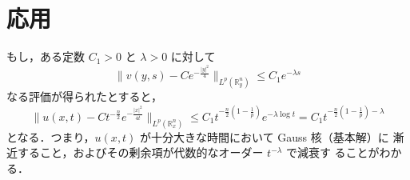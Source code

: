 \documentclass[paper=a4,
fontsize=12pt,
reqno,
uplatex,
dvipdfmx]{jlreq}
\theoremstyle{definition} %
\begin{document}
\section{応用}
もし，ある定数 $C_1 > 0$ と $\lambda > 0$ に対して
\begin{equation}
 \|
  v(y, s) - C e^{-\frac{|y|^2}{4}}
  \|_{L^p(\mathbb{R}_y^n)}
  \le
  C_1 e^{-\lambda s} 
\end{equation}
なる評価が得られたとすると，
\begin{equation}
 \|
  u(x, t) - C t^{-\frac{n}{2}} e^{-\frac{|x|^2}{4t}}
  \|_{L^p(\mathbb{R}_x^n)}
  \le
  C_1 t^{-\frac{n}{2}
  \left(
   1 - \frac{1}{p}
  \right)}
  e^{-\lambda \log t}
  =
  C_1 t^{-\frac{n}{2}
  \left(
   1 - \frac{1}{p}
  \right)
  - \lambda}
\end{equation}
となる．つまり，$u(x, t)$ が十分大きな時間において Gauss 核（基本解）に
漸近すること，およびその剰余項が代数的なオーダー $t^{-\lambda}$ で減衰す
ることがわかる．





\end{document}
